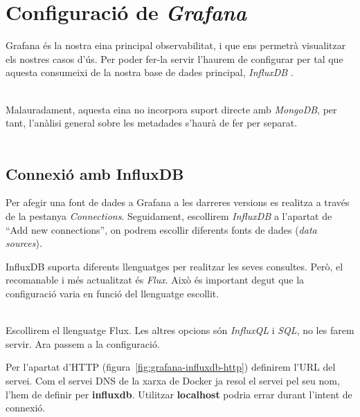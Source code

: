\chapter{Configuració de \textit{Grafana}}\label{ch:grafana-config}

Grafana és la nostra eina principal observabilitat, i que ens permetrà visualitzar els nostres casos d'ús.
Per poder fer-la servir l'haurem de configurar per tal que aquesta consumeixi de la nostra base de dades principal, \textit{InfluxDB} .

\noindent \\
Malauradament, aquesta eina no incorpora suport directe amb \textit{MongoDB}, per tant, l'anàlisi general sobre les metadades s'haurà de fer per separat. \\ \\

\section*{Connexió amb InfluxDB}\label{sec:influxdb-grafana-connection}

\noindent
Per afegir una font de dades a Grafana a les darreres versions es realitza a través de la pestanya \textit{Connections}.
Seguidament,  escollirem \textit{InfluxDB} a l'apartat de ``Add new connections'', on podrem escollir diferents fonts de dades (\textit{data sources}). \\

\noindent
\begin{tcolorbox}[colback=blue!5!white, colframe=blue!75!black, title=Llenguatge de cerca]
    InfluxDB suporta diferents llenguatges per realitzar les seves consultes.
    Però, el recomanable i més actualitzat és \textit{Flux}.
    Això és important degut que la configuració varia en funció del llenguatge escollit.
\end{tcolorbox}

\noindent \\
Escollirem el llenguatge Flux.
Les altres opcions són \textit{InfluxQL} i \textit{SQL}, no les farem servir.
Ara passem a la configuració.

\clearpage

\noindent
Per l'apartat d'HTTP (figura~\ref{fig:grafana-influxdb-http}) definirem l'\gls{URL} del servei.
Com el servei \gls{DNS} de la xarxa de \gls{Docker} ja resol el servei pel seu nom, l'hem de definir per \textbf{influxdb}.
Utilitzar \textbf{localhost} podria errar durant l'intent de connexió.

